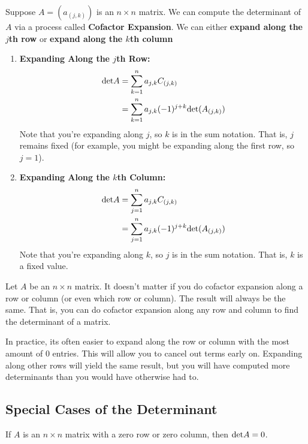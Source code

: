 \begin{definition}
    Suppose $A = (a_{(j, k)})$ is an $n \times n$ matrix. We can compute the determinant of $A$ via a process called \textbf{Cofactor Expansion}.
    We can either \textbf{expand along the $j$th row} or \textbf{expand along the $k$th column}
    \begin{enumerate}
        \item[] \textbf{Expanding Along the $j$th Row:}
        \begin{align*}
            \text{det} A &= \sum_{k = 1}^{n} a_{j,k} C_{(j,k)} \\
            &= \sum_{k = 1}^{n} a_{j,k} (-1)^{j + k} \text{det} (A_{(j,k)}) 
        \end{align*}
        Note that you're expanding along $j$, so $k$ is in the sum notation. That is, $j$ remains fixed (for example, you might be expanding along the
        first row, so $j = 1$).
        \item[] \textbf{Expanding Along the $k$th Column:}
        \begin{align*}
            \text{det} A &= \sum_{j = 1}^{n} a_{j,k} C_{(j,k)} \\
            &= \sum_{j = 1}^{n} a_{j,k} (-1)^{j + k} \text{det} (A_{(j,k)}) 
        \end{align*}
        Note that you're expanding along $k$, so $j$ is in the sum notation. That is, $k$ is a fixed value.
    \end{enumerate}
\end{definition}

\begin{thm}
    Let $A$ be an $n \times n$ matrix. It doesn't matter if you do cofactor expansion along a row or column (or even which row or column). The result
    will always be the same. That is, you can do cofactor expansion along any row and column to find the determinant of a matrix.
\end{thm}

\begin{remark}
    In practice, its often easier to expand along the row or column with the most amount of $0$ entries. This will allow you to cancel out terms early
    on. Expanding along other rows will yield the same result, but you will have computed more determinants than you would have otherwise had to. 
\end{remark}

\subsection{Special Cases of the Determinant}
\begin{lemma}
    If $A$ is an $n \times n$ matrix with a zero row or zero column, then $\text{det} A = 0$.
\end{lemma}

